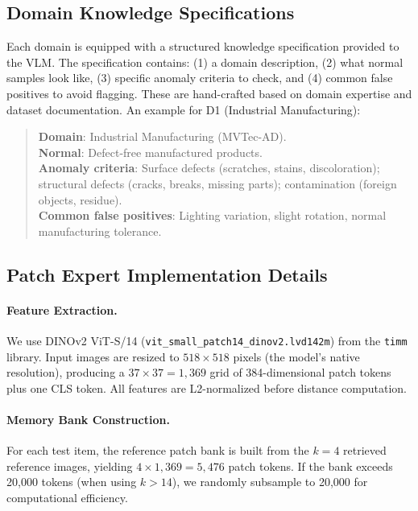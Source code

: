 \subsection{Domain Knowledge Specifications}
\label{app:domain_knowledge}

Each domain is equipped with a structured knowledge specification provided to the VLM. The specification contains: (1) a domain description, (2) what normal samples look like, (3) specific anomaly criteria to check, and (4) common false positives to avoid flagging. These are hand-crafted based on domain expertise and dataset documentation. An example for D1 (Industrial Manufacturing):

\begin{quote}
\small
\textbf{Domain}: Industrial Manufacturing (MVTec-AD). \\
\textbf{Normal}: Defect-free manufactured products. \\
\textbf{Anomaly criteria}: Surface defects (scratches, stains, discoloration); structural defects (cracks, breaks, missing parts); contamination (foreign objects, residue). \\
\textbf{Common false positives}: Lighting variation, slight rotation, normal manufacturing tolerance.
\end{quote}

\subsection{Patch Expert Implementation Details}
\label{app:patch_expert}

\paragraph{Feature Extraction.}
We use DINOv2 ViT-S/14 (\texttt{vit\_small\_patch14\_dinov2.lvd142m}) from the \texttt{timm} library. Input images are resized to $518 \times 518$ pixels (the model's native resolution), producing a $37 \times 37 = 1{,}369$ grid of 384-dimensional patch tokens plus one CLS token. All features are L2-normalized before distance computation.

\paragraph{Memory Bank Construction.}
For each test item, the reference patch bank is built from the $k=4$ retrieved reference images, yielding $4 \times 1{,}369 = 5{,}476$ patch tokens. If the bank exceeds 20,000 tokens (when using $k > 14$), we randomly subsample to 20,000 for computational efficiency.

